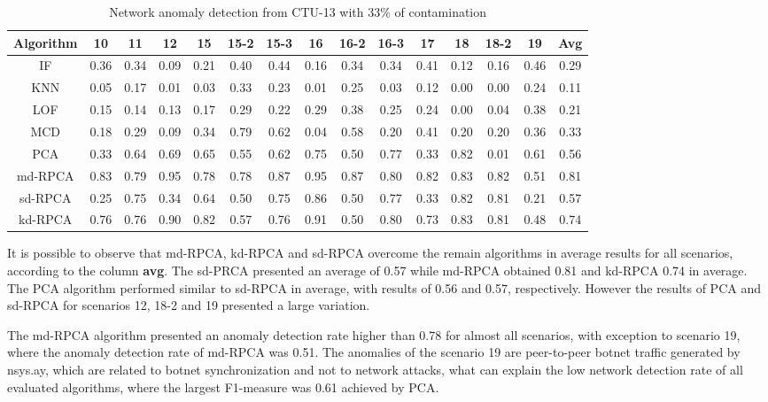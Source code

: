 \begin{table}[h!]
  \centering
  \scriptsize
  \caption{Network anomaly detection from CTU-13 with 33\% of contamination}
  \label{tab:4.03}
  \begin{tabular}{ c|c|c|c|c|c|c|c|c|c|c|c|c|c|c }
	\toprule
        \textbf{Algorithm}	&\textbf{10}	&\textbf{11}	&\textbf{12}	&\textbf{15}	&\textbf{15-2}	&\textbf{15-3}	&\textbf{16}	&\textbf{16-2}	&\textbf{16-3}	&\textbf{17}	&\textbf{18}	&\textbf{18-2}	&\textbf{19}	&\textbf{Avg} \\ \hline
        IF	&0.36	&0.34	&0.09	&0.21	&0.40	&0.44	&0.16	&0.34	&0.34	&0.41	&0.12	&0.16	&0.46	&0.29\\ \hline
        KNN	&0.05	&0.17	&0.01	&0.03	&0.33	&0.23	&0.01	&0.25	&0.03	&0.12	&0.00	&0.00	&0.24	&0.11\\ \hline
        LOF	&0.15	&0.14	&0.13	&0.17	&0.29	&0.22	&0.29	&0.38	&0.25	&0.24	&0.00	&0.04	&0.38	&0.21\\ \hline
        MCD	&0.18	&0.29	&0.09	&0.34	&0.79	&0.62	&0.04	&0.58	&0.20	&0.41	&0.20	&0.20	&0.36	&0.33\\ \hline
        PCA	&0.33	&0.64	&0.69	&0.65	&0.55	&0.62	&0.75	&0.50	&0.77	&0.33	&0.82	&0.01	&0.61	&0.56\\ \hline
        md-RPCA &0.83	&0.79	&0.95	&0.78	&0.78	&0.87	&0.95	&0.87	&0.80	&0.82	&0.83	&0.82	&0.51	&0.81\\ \hline
        sd-RPCA &0.25	&0.75	&0.34	&0.64	&0.50	&0.75	&0.86	&0.50	&0.77	&0.33	&0.82	&0.81	&0.21	&0.57\\ \hline
        kd-RPCA &0.76	&0.76	&0.90	&0.82	&0.57	&0.76	&0.91	&0.50	&0.80	&0.73	&0.83	&0.81	&0.48	&0.74\\ \hline
    \bottomrule
  \end{tabular}
\end{table}

It is possible to observe that md-RPCA, kd-RPCA and sd-RPCA overcome the remain algorithms in average results for all scenarios, according to the column \textbf{avg}. The sd-PRCA presented an average of 0.57 while md-RPCA obtained 0.81 and kd-RPCA 0.74 in average. The PCA algorithm performed similar to sd-RPCA in average, with results of 0.56 and 0.57, respectively. However the results of PCA and sd-RPCA for scenarios 12, 18-2 and 19 presented a large variation.

The md-RPCA algorithm presented an anomaly detection rate higher than 0.78 for almost all scenarios, with exception to scenario 19, where the anomaly detection rate of md-RPCA was 0.51. The anomalies of the scenario 19 are peer-to-peer botnet traffic generated by nsys.ay, which are related to botnet synchronization and not to network attacks, what can explain the low network detection rate of all evaluated algorithms, where the largest F1-measure was 0.61 achieved by PCA.

